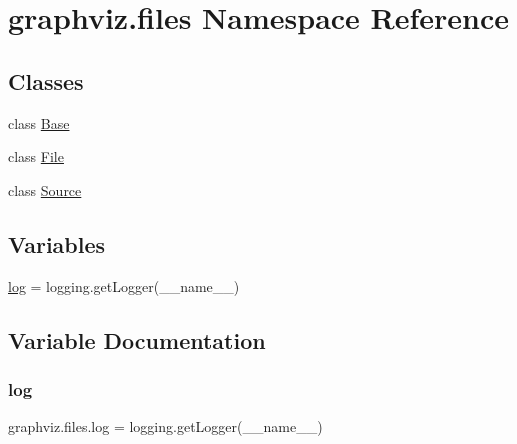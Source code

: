 \hypertarget{namespacegraphviz_1_1files}{}\section{graphviz.\+files Namespace Reference}
\label{namespacegraphviz_1_1files}
\subsection*{Classes}
\begin{DoxyCompactItemize}
\item 
class \hyperlink{classgraphviz_1_1files_1_1Base}{Base}
\item 
class \hyperlink{classgraphviz_1_1files_1_1File}{File}
\item 
class \hyperlink{classgraphviz_1_1files_1_1Source}{Source}
\end{DoxyCompactItemize}
\subsection*{Variables}
\begin{DoxyCompactItemize}
\item 
\hyperlink{namespacegraphviz_1_1files_a2a8980749b545913a2c269c89d1bdee6}{log} = logging.\+get\+Logger(\+\_\+\+\_\+name\+\_\+\+\_\+)
\end{DoxyCompactItemize}


\subsection{Variable Documentation}
\mbox{\label{namespacegraphviz_1_1files_a2a8980749b545913a2c269c89d1bdee6}} 
\subsubsection{\texorpdfstring{log}{log}}
{\footnotesize\ttfamily graphviz.\+files.\+log = logging.\+get\+Logger(\+\_\+\+\_\+name\+\_\+\+\_\+)}

